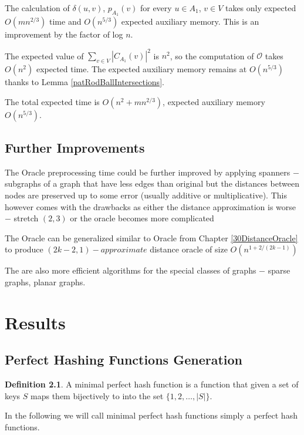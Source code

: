\documentclass[shortabstract, lic, english]{iithesis}
\theoremstyle{definition} \newtheorem{definition}{Definition}[chapter]
\theoremstyle{remark} \newtheorem{remark}[definition]{Observation}
\theoremstyle{plain} \newtheorem{theorem}[definition]{Theorem}
\theoremstyle{plain} \newtheorem{lemma}[definition]{Lemma}
\theoremstyle{plain} \newtheorem{conjecture}[definition]{Conjecture}
\begin{document}
The calculation of $\delta(u,v)$, $p_{A_1}(v)$ for every $u \in A_1$, $v \in V$ takes only expected $O(mn^{2/3})$ time and $O(n^{5/3})$ expected auxiliary memory.
This is an improvement by the factor of log $n$.

The expected value of $\sum_{v \in V}|C_{A_1}(v)|^2$ is $n^2$, so the computation of $\mathcal{O}$ takes $O(n^2)$ expected time.
The expected auxiliary memory remains at $O(n^{5/3})$ thanks to Lemma \ref{patRodBallIntersections}.

The total expected time is $O(n^{2} + mn^{2/3})$, expected auxiliary memory $O(n^{5/3})$.

\section{Further Improvements}

The Oracle preprocessing time could be further improved by applying spanners $-$ subgraphs of a graph that have less edges than original
but the distances between nodes are preserved up to some error (usually additive or multiplicative).
This however comes with the drawbacks as either the distance approximation is worse $-$ stretch $(2,3)$ \cite{21OracleBasic} or the oracle becomes more complicated \cite{21OracleSpannerNoPenalty} \cite{21OracleSpannerNoPenaltyNoLog}

The Oracle can be generalized similar to Oracle from Chapter \ref{30DistanceOracle} to produce $(2k - 2, 1)-approximate$ distance oracle of size $O(n^{1 + 2/(2k-1)})$ \cite{a1Oracle}

The are also more efficient algorithms for the special classes of graphs $-$ sparse graphs, planar graphs.


\chapter{Results} \label{21PracticalComparison}

\section{Perfect Hashing Functions Generation}

\begin{definition}
    A minimal perfect hash function is a function that given a set of keys $S$ maps them bijectively to into the set $\{1,2,\ldots,|S|\}$.
\end{definition}

In the following we will call minimal perfect hash functions simply a perfect hash functions.
\end{document}
